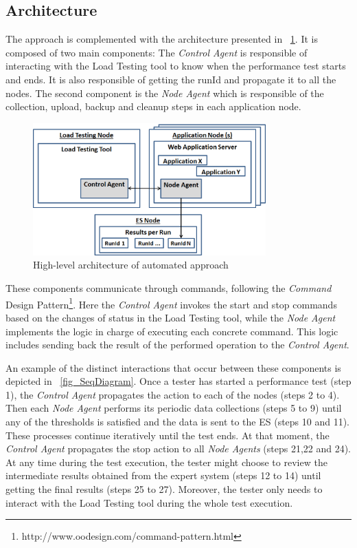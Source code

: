 \documentclass[runningheads,a4paper]{llncs}
\begin{document}
\vspace{-5pt}
\subsection{Architecture}
\vspace{-5pt}
The approach is complemented with the architecture
presented in \figurename ~\ref{fig_Arch}. It is composed of two main components:
The \emph{Control Agent} is responsible of interacting with the Load
Testing tool to know when the performance test starts and ends. It is also
responsible of getting the runId and propagate it to all the nodes. The second
component is the \emph{Node Agent} which is responsible of the collection,
upload, backup and cleanup steps in each application node. 

\begin{figure}[!h]
\centering
\includegraphics[totalheight=.22\textheight,width=0.8\textwidth]{architecture_dwait}
\caption{High-level architecture of automated approach}
\label{fig_Arch}
\end{figure}

These components communicate through commands, following the \emph{Command}
Design Pattern\footnote{http://www.oodesign.com/command-pattern.html}. Here the
\emph{Control Agent} invokes the start and stop commands based on the
changes of status in the Load Testing tool, while the \emph{Node Agent}
implements the logic in charge of executing each concrete command. This logic
includes sending back the result of the performed operation to the \emph{Control
Agent}.

An example of the distinct interactions that occur between these
components is depicted in \figurename ~\ref{fig_SeqDiagram}. Once a tester has
started a performance test (step 1), the \emph{Control Agent} propagates the
action to each of the nodes (steps 2 to 4). Then each \emph{Node Agent} performs
its periodic data collections (steps 5 to 9) until any of the thresholds is
satisfied and the data is sent to the ES (steps 10 and 11). These processes
continue iteratively until the test ends. At that moment, the \emph{Control
Agent} propagates the stop action to all \emph{Node Agents} (steps 21,22 and
24). At any time during the test execution, the tester might choose to review
the intermediate results obtained from the expert system (steps 12 to 14) until
getting the final results (steps 25 to 27). Moreover, the tester only needs to
interact with the Load Testing tool during the whole test execution.
\end{document}

